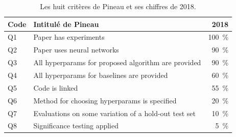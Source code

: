 \begin{table}[htbp]
\centering
\small
\caption{Les huit critères de Pineau et ses chiffres de 2018.}
\label{tab:a-pineau-2018}
\begin{tabular}{@{}llr@{}}
\toprule
Code & Intitulé de Pineau & 2018 \\
\midrule
Q1 & Paper has experiments & 100~\% \\
Q2 & Paper uses neural networks & 90~\% \\
Q3 & All hyperparams for proposed algorithm are provided & 90~\% \\
Q4 & All hyperparams for baselines are provided & 60~\% \\
Q5 & Code is linked & 55~\% \\
Q6 & Method for choosing hyperparams is specified & 20~\% \\
Q7 & Evaluations on some variation of a hold-out test set & 10~\% \\
Q8 & Significance testing applied & 5~\% \\
\bottomrule
\end{tabular}
\end{table}

